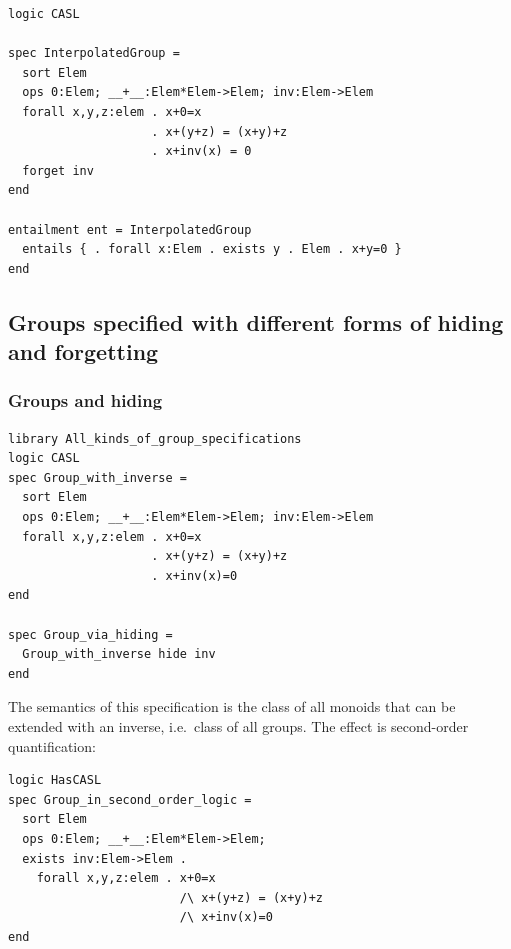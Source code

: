 \documentclass[10pt,fleqn,%
\ifpretendfinal
final%
\else
draft%
\fi,
]{scrreprt}
\newcommand{\ssclause}[1]{\subsection{#1}}
\newcommand{\sssclause}[1]{\subsubsection{#1}}
\begin{document}
\begin{lstlisting}[basicstyle=\ttfamily,language=dolText,morekeywords={props,ObjectProperty,Class,DisjointUnionOf,SubClassOf,Characteristics,Transitive,Asymmetric,SubPropertyOf,DisjointClasses,EquivalentTo,inverse,only,forall,iff,if,or,exists,sort,ops,forget,entails,entailment,spec},escapechar=@,mathescape]
logic CASL

spec InterpolatedGroup =
  sort Elem
  ops 0:Elem; __+__:Elem*Elem->Elem; inv:Elem->Elem
  forall x,y,z:elem . x+0=x
                    . x+(y+z) = (x+y)+z
                    . x+inv(x) = 0
  forget inv
end

entailment ent = InterpolatedGroup 
  entails { . forall x:Elem . exists y . Elem . x+y=0 }
end
\end{lstlisting}

\ssclause{Groups specified with different forms of hiding and forgetting}

\sssclause{Groups and hiding}
\begin{lstlisting}[basicstyle=\ttfamily,language=dolText,morekeywords={props,ObjectProperty,Class,DisjointUnionOf,SubClassOf,Characteristics,Transitive,Asymmetric,SubPropertyOf,DisjointClasses,EquivalentTo,inverse,only,forall,iff,if,or,exists,sort,ops,spec},escapechar=@,mathescape]
library All_kinds_of_group_specifications
logic CASL
spec Group_with_inverse =
  sort Elem
  ops 0:Elem; __+__:Elem*Elem->Elem; inv:Elem->Elem
  forall x,y,z:elem . x+0=x
                    . x+(y+z) = (x+y)+z
                    . x+inv(x)=0
end

spec Group_via_hiding =
  Group_with_inverse hide inv
end
\end{lstlisting}

The semantics of this specification is the class of all monoids that
can be extended with an inverse, i.e.\ class of all groups. The effect
is second-order quantification:

\begin{lstlisting}[basicstyle=\ttfamily,language=dolText,morekeywords={props,ObjectProperty,Class,DisjointUnionOf,SubClassOf,Characteristics,Transitive,Asymmetric,SubPropertyOf,DisjointClasses,EquivalentTo,inverse,only,forall,iff,if,or,exists,sort,ops,spec},escapechar=@,mathescape]
logic HasCASL
spec Group_in_second_order_logic =
  sort Elem
  ops 0:Elem; __+__:Elem*Elem->Elem; 
  exists inv:Elem->Elem .
    forall x,y,z:elem . x+0=x
                        /\ x+(y+z) = (x+y)+z
                        /\ x+inv(x)=0
end
\end{lstlisting}
\end{document}
